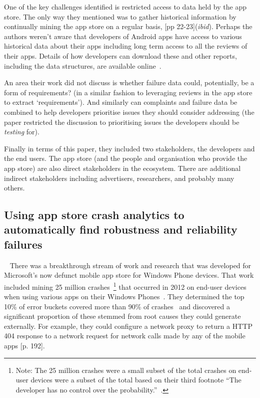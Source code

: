 One of the key challenges identified is restricted access to data held by the app store. The only way they mentioned was to gather historical information by continually mining the app store on a regular basis, [pp 22-23](\textit{ibid}). Perhaps the authors weren't aware that developers of Android apps have access to various historical data about their apps including long term access to all the reviews of their apps. Details of how developers can download these and other reports, including the data structures, are available online~\citep{google_play_download_and_export_monthly_reports}.

An area their work did not discuss is whether failure data could, potentially, be a form of requirements? (in a similar fashion to leveraging reviews in the app store to extract `requirements'). And similarly can complaints and failure data be combined to help developers prioritise issues they should consider addressing (the paper restricted the discussion to prioritising issues the developers should be \textit{testing} for).

Finally in terms of this paper, they included two stakeholders, the developers and the end users. The app store (and the people and organisation who provide the app store) are also direct stakeholders in the ecosystem. There are additional indirect stakeholders including advertisers, researchers, and probably many others. 


\subsection{Using app store crash analytics to automatically find robustness and reliability failures}~\label{rw-windows-phone-store-crash-analysis-section}
There was a breakthrough stream of work and research that was developed for Microsoft's now defunct mobile app store for Windows Phone devices. That work included mining 25 million crashes~\footnote{Note: The 25 million crashes were a small subset of the total crashes on end-user devices were a subset of the total based on their third footnote ``The developer has no control over the probability.''~\citep[p. 191]{ravindrath2014_automatic_and_scalable_fault_detection_for_mobile_apps}.} that occurred in 2012 on end-user devices when using various apps on their Windows Phones~\citep[p. 190]{ravindrath2014_automatic_and_scalable_fault_detection_for_mobile_apps}. They determined the top 10\% of error buckets covered more than 90\% of crashes~\citep[p. 192]{ravindrath2014_automatic_and_scalable_fault_detection_for_mobile_apps} and discovered a significant proportion of these stemmed from root causes they could generate externally. For example, they could configure a network proxy to return a HTTP 404 response to a network request for network calls made by any of the mobile apps [p. 192].

